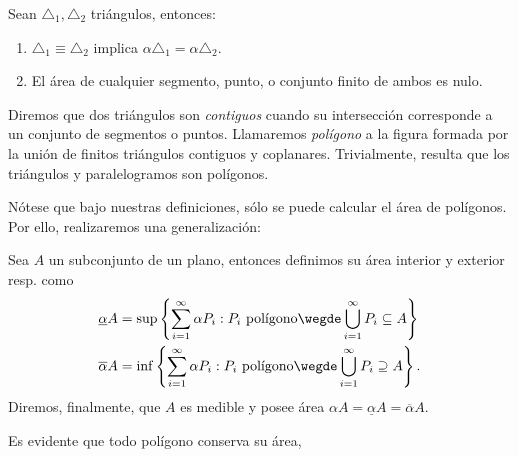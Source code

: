 \documentclass[11pt,a4paper]{book}
\begin{document}
\begin{prop}
	Sean $\triangle_1,\triangle_2$ triángulos, entonces:
	\begin{enumerate}
		\item $\triangle_1\equiv\triangle_2$ implica $\alpha\triangle_1=\alpha\triangle_2$.
		\item El área de cualquier segmento, punto, o conjunto finito de ambos es nulo.
	\end{enumerate}
\end{prop}
\begin{mydef}[Polígono]
	Diremos que dos triángulos son \textit{contiguos} cuando su intersección corresponde a un conjunto de segmentos o puntos. Llamaremos \textit{polígono} a la figura formada por la unión de finitos triángulos contiguos y coplanares. Trivialmente, resulta que los triángulos y paralelogramos son polígonos.
\end{mydef}
Nótese que bajo nuestras definiciones, sólo se puede calcular el área de polígonos. Por ello, realizaremos una generalización:
\begin{mydef}
	Sea $A$ un subconjunto de un plano, entonces definimos su área interior y exterior resp. como
	\begin{align}
		\underline{\alpha}A&=\sup\left\{\sum_{i=1}^\infty\alpha P_i:P_i\text{ polígono}\wegde\bigcup_{i=1}^\infty P_i\subseteq A\right\}\\
		\overline{\alpha}A&=\inf\left\{\sum_{i=1}^\infty\alpha P_i:P_i\text{ polígono}\wegde\bigcup_{i=1}^\infty P_i\supseteq A\right\}.
	\end{align}
	Diremos, finalmente, que $A$ es medible y posee área $\alpha A=\underline{\alpha}A=\overline{\alpha}A$.
\end{mydef}
Es evidente que todo polígono conserva su área, 
\end{document}
